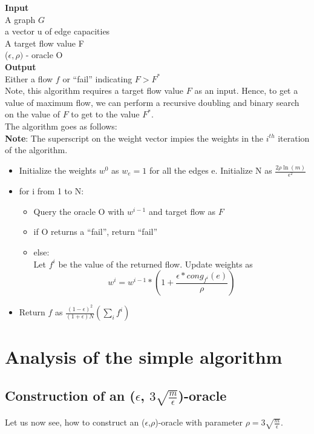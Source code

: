 \documentclass[a4paper,10pt]{article}
\newcommand{\eps}{\epsilon}
\begin{document}
	      \textbf{Input} \\
	      A graph $G$ \\
	      a vector u of edge capacities \\
	      A target flow value F \\
	      ($\eps, \rho)$ - oracle O \\
	      
	      \textbf{Output}\\
	      Either a flow $f$ or ``fail'' indicating $F > F^{\ast}$ \\
	      
	      Note, this algorithm requires a target flow value $F$ as an input. Hence, to get a value of maximum flow, we can perform a recursive
	      doubling and binary search on the value of $F$ to get to the value $F^{\ast}$. \\
	      
	      The algorithm goes as follows: \\
	      
	      \textbf{Note}: The superscript on the weight vector impies the weights in the $i^{th}$ iteration of the algorithm.
	      \begin{itemize}
	       \item 
		Initialize the weights $w^0$ as $w_e =1$ for all the edges e. Initialize N as $\frac{2\rho \ln(m)}{\eps^2}$
	      \item
		for i from 1 to N:
		  \begin{itemize}
		   \item 
		      Query the oracle O with $w^{i-1}$ and target flow as $F$
		   \item
		      if O returns a ``fail'', return ``fail''
		   \item
		      else: \\
		      	Let $f^i$ be the value of the returned flow. Update weights as
			 $$w^{i} = w^{i-1}\ast\left(1+\frac{\eps\ast cong_{f^i}(e)}{\rho}\right)$$
		  \end{itemize}

		\item
		  Return $f$ as $\frac{(1-\eps)^2}{(1+\eps)N}\left(\sum\limits_{i} f^i\right)$
	      \end{itemize}
	
	  \section{Analysis of the simple algorithm}
	    \subsection{Construction of an ($\eps$, $3\sqrt{\frac{m}{\eps}}$)-oracle}
		Let us now see, how to construct an ($\eps$,$\rho$)-oracle with parameter $\rho = 3\sqrt{\frac{m}{\eps}}$. \\
		
\end{document}
